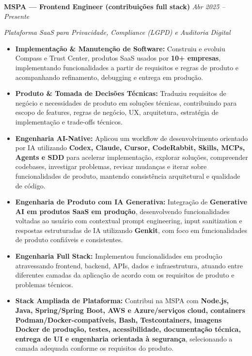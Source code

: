 \documentclass[10pt,a4paper]{article}
\begin{document}
\noindent
\textbf{MSPA — Frontend Engineer (contribuições full stack)}
\hfill
\textit{Abr 2025 -- Presente}

\textit{Plataforma SaaS para Privacidade, Compliance (LGPD) e Auditoria Digital}

\begin{itemize}

    \item
    \textbf{Implementação \& Manutenção de Software:}
    Construiu e evoluiu Compass e Trust Center, produtos SaaS usados
    por \textbf{10+ empresas}, implementando funcionalidades a partir
    de requisitos e regras de produto e acompanhando refinamento,
    debugging e entrega em produção.

    \item
    \textbf{Produto \& Tomada de Decisões Técnicas:}
    Traduziu requisitos de negócio e necessidades de produto em
    soluções técnicas, contribuindo para escopo de features,
    regras de negócio, UX, arquitetura, estratégia de
    implementação e trade-offs técnicos.

    \item
    \textbf{Engenharia AI-Native:}
    Aplicou um workflow de desenvolvimento orientado por IA
    utilizando \textbf{Codex, Claude, Cursor, CodeRabbit, Skills,
    MCPs, Agents e SDD} para acelerar implementação, explorar
    soluções, compreender codebases, investigar problemas,
    revisar mudanças e iterar sobre funcionalidades de produto,
    mantendo consistência arquitetural e qualidade de código.

    \item
    \textbf{Engenharia de Produto com IA Generativa:}
    Integração de \textbf{Generative AI em produtos SaaS em
    produção}, desenvolvendo funcionalidades voltadas ao usuário
    com contextual prompt engineering, input sanitization e
    respostas estruturadas de IA utilizando \textbf{Genkit},
    com foco em funcionalidades de produto confiáveis e
    consistentes.

    \item
    \textbf{Engenharia Full Stack:}
    Implementou funcionalidades em produção atravessando
    frontend, backend, APIs, dados e infraestrutura, atuando
    entre diferentes camadas da aplicação de acordo com os
    requisitos de produto e problemas técnicos.

    \item
    \textbf{Stack Ampliada de Plataforma:}
    Contribui na MSPA com \textbf{Node.js, Java, Spring/Spring Boot,
    AWS e Azure/serviços cloud, containers Podman/Docker-compatíveis,
    Bash, Testcontainers, imagens Docker de produção, testes, acessibilidade,
    documentação técnica, entrega de UI e engenharia orientada à segurança},
    selecionando a camada adequada conforme os requisitos do produto.


\end{itemize}
\end{document}
